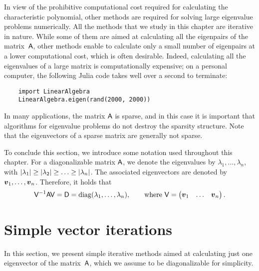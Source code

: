 In view of the prohibitive computational cost required for calculating the characteristic polynomial,
other methods are required for solving large eigenvalue problems numerically.
All the methods that we study in this chapter are iterative in nature.
While some of them are aimed at calculating all the eigenpairs of the matrix~$\mathsf A$,
other methods enable to calculate only a small number of eigenpairs at a lower computational cost,
which is often desirable.
Indeed, calculating all the eigenvalues of a large matrix is computationally expensive;
on a personal computer, the following Julia code takes well over a second to terminate:
\begin{verbatim}
    import LinearAlgebra
    LinearAlgebra.eigen(rand(2000, 2000))
\end{verbatim}

In many applications,
the matrix $\mathsf A$ is sparse,
and in this case it is important that algorithms for eigenvalue problems do not destroy the sparsity structure.
Note that the eigenvectors of a sparse matrix are generally not sparse.

To conclude this section,
we introduce some notation used throughout this chapter.
For a diagonalizable matrix $\mathsf A$,
we denote the eigenvalues by $\lambda_1, \dotsc, \lambda_n$,
with $\lvert\lambda_1\rvert \geq \lvert\lambda_2\rvert \geq \dotsc \geq \lvert\lambda_n\rvert$.
The associated eigenvectors are denoted by $\mathbf{\boldsymbol{v}}_1, \dotsc, \mathbf{\boldsymbol{v}}_n$.
Therefore, it holds that
\[
    \mathsf V^{-1} \mathsf A \mathsf V = \mathsf D = \operatorname{diag}(\lambda_1, \dotsc, \lambda_n),
    \qquad \text{where } \mathsf V = \begin{pmatrix} \mathbf{\boldsymbol{v}}_1 & \hdots & \mathbf{\boldsymbol{v}}_n \end{pmatrix}.
\]

\section{Simple vector iterations}
\label{sec:simple_vector_iterations}

In this section,
we present simple iterative methods aimed at calculating just one eigenvector of the matrix~$\mathsf A$,
which we assume to be diagonalizable for simplicity.

